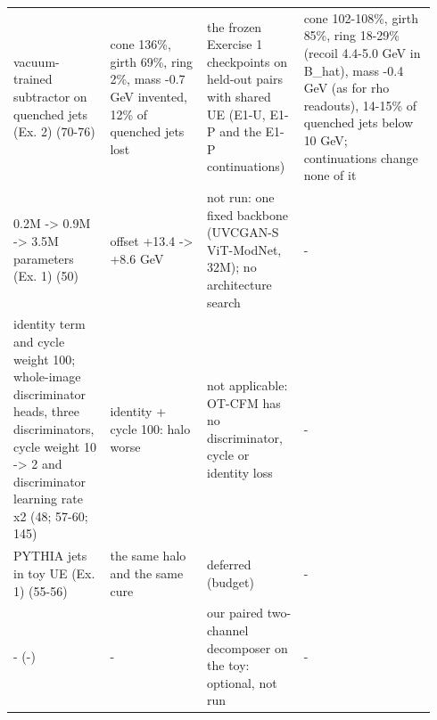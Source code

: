 \begin{tabular}{p{0.2\linewidth}p{0.22\linewidth}p{0.22\linewidth}p{0.3\linewidth}}
vacuum-trained subtractor on quenched jets (Ex. 2) (70-76) & cone 136\%, girth 69\%, ring 2\%, mass -0.7 GeV invented, 12\% of quenched jets lost & the frozen Exercise 1 checkpoints on held-out pairs with shared UE (E1-U, E1-P and the E1-P continuations) & cone 102-108\%, girth 85\%, ring 18-29\% (recoil 4.4-5.0 GeV in B\_hat), mass -0.4 GeV (as for rho readouts), 14-15\% of quenched jets below 10 GeV; continuations change none of it \\
0.2M -> 0.9M -> 3.5M parameters (Ex. 1) (50) & offset +13.4 -> +8.6 GeV & not run: one fixed backbone (UVCGAN-S ViT-ModNet, 32M); no architecture search & - \\
identity term and cycle weight 100; whole-image discriminator heads, three discriminators, cycle weight 10 -> 2 and discriminator learning rate x2 (48; 57-60; 145) & identity + cycle 100: halo worse & not applicable: OT-CFM has no discriminator, cycle or identity loss & - \\
PYTHIA jets in toy UE (Ex. 1) (55-56) & the same halo and the same cure & deferred (budget) & - \\
- (-) & - & our paired two-channel decomposer on the toy: optional, not run & - \\
\bottomrule
\end{tabular}
